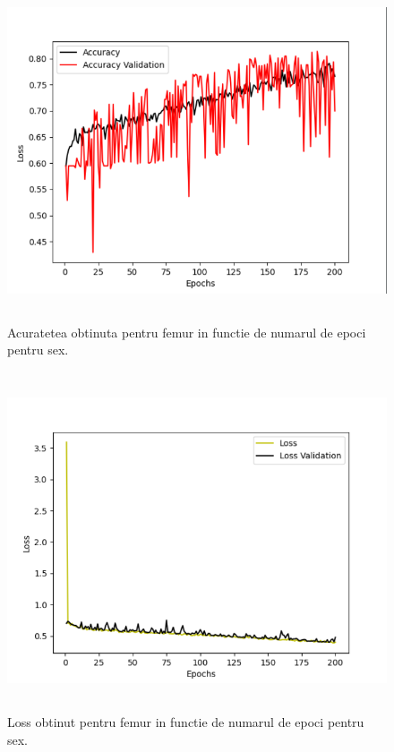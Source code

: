 \documentclass[runningheads,a4paper,11pt]{report}
\begin{document}
\begin{figure}[h!]
\centerline{\includegraphics[height=10cm]{Imagini/acuratete_femur.png}}
\caption{Acuratetea obtinuta pentru femur in functie de numarul de epoci pentru sex.}
\label{fig}
\end{figure}

\begin{figure}[h!]
\centerline{\includegraphics[height=10cm]{Imagini/loss_femur.png}}
\caption{Loss obtinut pentru femur in functie de numarul de epoci pentru sex.}
\label{fig}
\end{figure}
\end{document}
